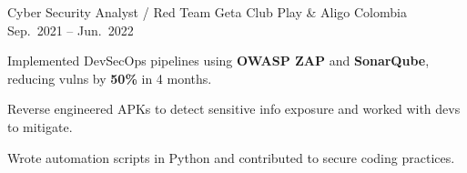 \begin{cventries}
  \cventry
  {Cyber Security Analyst / Red Team}
  {Geta Club Play \& Aligo}
  {Colombia}
  {Sep.\ 2021 -- Jun.\ 2022}
  {
    \begin{cvitems}
      \item {Implemented DevSecOps pipelines using \textbf{OWASP ZAP} and \textbf{SonarQube}, reducing vulns by \textbf{50\%} in 4 months.}
      \item {Reverse engineered APKs to detect sensitive info exposure and worked with devs to mitigate.}
      \item {Wrote automation scripts in Python and contributed to secure coding practices.}
    \end{cvitems}
  }

\end{cventries}
